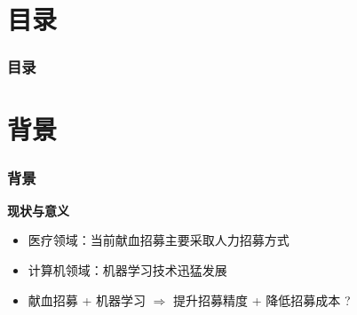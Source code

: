 \documentclass[10pt,aspectratio=43,mathserif]{beamer}
\title[RF-based Blood Donor Recruitment]{\fontsize{13pt}{18pt}\selectfont {基于随机森林的献血招募模型}}
\author[Zixing Song]{
  宋子星 \\
  }
\institute[SEU]{
  东南大学计算机科学与工程学院\\
  }
\date[\today]{
 \today}
\begin{document}
\begin{frame}
\titlepage
\end{frame}				%



\section*{目录}

		\begin{frame}
		\frametitle{\textbf{目录}}
		\textbf{\tableofcontents}
		\end{frame}				%

\section{背景}

		\begin{frame}
            \frametitle{\textbf{背景}}

            \begin{block}{\textbf{现状与意义}}
                \begin{itemize}
                    \item 医疗领域：当前献血招募主要采取人力招募方式
                    \item 计算机领域：机器学习技术迅猛发展
                    \item 献血招募 + 机器学习 $\Rightarrow$ 提升招募精度 + 降低招募成本 ?
                \end{itemize}
            \end{block}

            \begin{figure}[!t]
                \centering 
            \end{figure}

    \end{frame}
\end{document}
